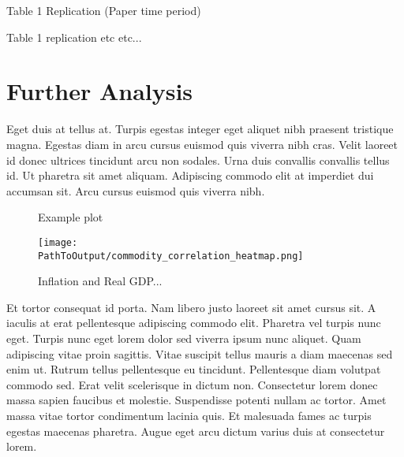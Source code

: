 \documentclass[12pt]{article}
\begin{document}
\begin{table}[ht!]
    \caption{Table 1 Replication (Paper time period)}
    \centering
    \begin{adjustbox}{max width=\textwidth}
    
    \end{adjustbox}
    \caption*{
      Table 1 replication etc etc...
    }
    \label{table:paper_table1_replication}
\end{table}

\newpage
\section{Further Analysis}
Eget duis at tellus at. Turpis egestas integer eget aliquet nibh praesent
tristique magna. Egestas diam in arcu cursus euismod quis viverra nibh cras.
Velit laoreet id donec ultrices tincidunt arcu non sodales. Urna duis
convallis convallis tellus id. Ut pharetra sit amet aliquam. Adipiscing
commodo elit at imperdiet dui accumsan sit. Arcu cursus euismod quis viverra
nibh. 



\begin{figure}[ht!]
\centering
\caption{Example plot}
  \centering
  \texttt{[image: \\PathToOutput/commodity\_correlation\_heatmap.png]}
\caption*{
  Inflation and Real GDP...
  }
\label{fig:commodity_correlation_heatmap}
\end{figure}


Et tortor consequat id porta. Nam libero justo laoreet sit amet cursus sit. A
iaculis at erat pellentesque adipiscing commodo elit. Pharetra vel turpis
nunc eget. Turpis nunc eget lorem dolor sed viverra ipsum nunc aliquet. Quam
adipiscing vitae proin sagittis. Vitae suscipit tellus mauris a diam maecenas
sed enim ut. Rutrum tellus pellentesque eu tincidunt. Pellentesque diam
volutpat commodo sed. Erat velit scelerisque in dictum non. Consectetur lorem
donec massa sapien faucibus et molestie. Suspendisse potenti nullam ac
tortor. Amet massa vitae tortor condimentum lacinia quis. Et malesuada fames
ac turpis egestas maecenas pharetra. Augue eget arcu dictum varius duis at
consectetur lorem.




\end{document}
